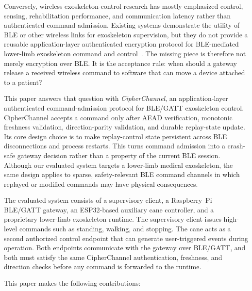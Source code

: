 \documentclass[journal]{IEEEtran}
\begin{document}
Conversely, wireless exoskeleton-control research has mostly emphasized control, sensing, rehabilitation performance, and communication latency rather than authenticated command admission. Existing systems demonstrate the utility of BLE or other wireless links for exoskeleton supervision, but they do not provide a reusable application-layer authenticated encryption protocol for BLE-mediated lower-limb exoskeleton command and control~\cite{andersson2024wireless,vinoj2019bclle,ozhiken2025ankle,wilhelm2022finger}. The missing piece is therefore not merely encryption over BLE. It is the acceptance rule: when should a gateway release a received wireless command to software that can move a device attached to a patient?

This paper answers that question with \emph{CipherChannel}, an application-layer authenticated command-admission protocol for BLE/GATT exoskeleton control. CipherChannel accepts a command only after AEAD verification, monotonic freshness validation, direction-parity validation, and durable replay-state update. Its core design choice is to make replay-control state persistent across BLE disconnections and process restarts. This turns command admission into a crash-safe gateway decision rather than a property of the current BLE session. Although our evaluated system targets a lower-limb medical exoskeleton, the same design applies to sparse, safety-relevant BLE command channels in which replayed or modified commands may have physical consequences.

The evaluated system consists of a supervisory client, a Raspberry~Pi BLE/GATT gateway, an ESP32-based auxiliary cane controller, and a proprietary lower-limb exoskeleton runtime. The supervisory client issues high-level commands such as standing, walking, and stopping. The cane acts as a second authorized control endpoint that can generate user-triggered events during operation. Both endpoints communicate with the gateway over BLE/GATT, and both must satisfy the same CipherChannel authentication, freshness, and direction checks before any command is forwarded to the runtime.

This paper makes the following contributions:
\end{document}
